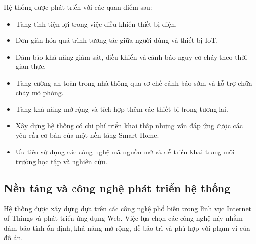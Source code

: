 \documentclass[a4paper,12pt]{article}
\begin{document}
Hệ thống được phát triển với các quan điểm sau:

\begin{itemize}
\item Tăng tính tiện lợi trong việc điều khiển thiết bị điện.

\item Đơn giản hóa quá trình tương tác giữa người dùng và thiết bị IoT.

\item Đảm bảo khả năng giám sát, điều khiển và cảnh báo nguy cơ cháy theo thời gian thực.

\item Tăng cường an toàn trong nhà thông qua cơ chế cảnh báo sớm và hỗ trợ chữa cháy mô phỏng.

\item Tăng khả năng mở rộng và tích hợp thêm các thiết bị trong tương lai.

\item Xây dựng hệ thống có chi phí triển khai thấp nhưng vẫn đáp ứng được các yêu cầu cơ bản của một nền tảng Smart Home.

\item Ưu tiên sử dụng các công nghệ mã nguồn mở và dễ triển khai trong môi trường học tập và nghiên cứu.

\end{itemize}


\subsection{Nền tảng và công nghệ phát triển hệ thống}
Hệ thống được xây dựng dựa trên các công nghệ phổ biến trong lĩnh vực Internet of Things và phát triển ứng dụng Web. Việc lựa chọn các công nghệ này nhằm đảm bảo tính ổn định, khả năng mở rộng, dễ bảo trì và phù hợp với phạm vi của đồ án.
\end{document}
